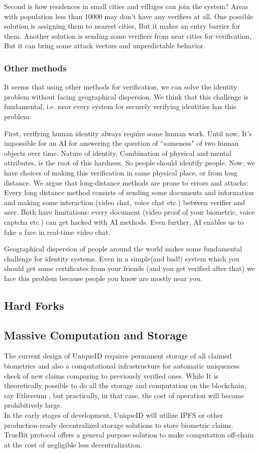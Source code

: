 \documentclass[conference]{IEEEtran}
\begin{document}
Second is how residences in small cities and villages can join the system? Areas with population less than 10000  may don't have any verifiers at all. One possible solution is assigning them to nearest cities, But it makes an entry barrier for them. Another solution is sending some verifiers from near cities for verification, But it can bring some attack vectors and unpredictable behavior. 

\subsubsection*{Other methods}
It seems that using other methods for verification, we can solve the identity problem without facing geographical dispersion. We think that this challenge is fundamental, i.e. near every system for securely verifying identities has this problem.


First, verifying human identity always require some human work. Until now, It's impossible for an AI for answering the question of ``sameness" of two human objects over time. Nature of identity, Combination of physical and mental attributes, is the root of this hardness. So people should identify people. Now, we have choices of making this verification in same physical place, or from long distance. We argue that long-distance methods are prone to errors and attacks: Every long distance method consists of sending some documents and information and making some interaction (video chat, voice chat etc.) between verifier and user. Both have limitations: every document (video proof of your biometric, voice captcha etc.) can get hacked with AI methods. Even further, AI enables us to fake a face in real-time video chat.


Geographical dispersion of people around the world makes some fundamental challenge for identity systems. Even in a simple(and bad!) system which you should get some certificates from your friends (and you get verified after that) we face this problem because people you know are mostly near you. 





\subsection{Hard Forks}
\subsection{Massive Computation and Storage}
The current design of UniqueID requires permanent storage of all claimed biometrics and also a computational infrastructure for automatic uniqueness check of new claims comparing to previously verified ones. While It is theoretically possible to do all the storage and computation on the blockchain, say Ethereum \cite{ethereum}, but practically, in that case, the cost of operation will become prohibitively large. \\
In the early stages of development, UniqueID will utilize IPFS or other production-ready decentralized storage solutions to store biometric claims. TrueBit protocol offers a general purpose solution to make computation off-chain at the cost of negligible less decentralization. 
\end{document}
